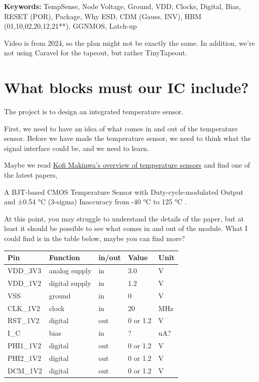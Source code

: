 \textbf{Keywords:} TempSense, Node Voltage, Ground, VDD, Clocks,
Digital, Bias, RESET (POR), Package, Why ESD, CDM (Gauss, INV), HBM
(01,10,02,20,12,21**), GGNMOS, Latch-up

Video is from 2024, so the plan might not be exactly the same. In
addition, we're not using Caravel for the tapeout, but rather
TinyTapeout.

\section{What blocks must our IC
include?}\label{what-blocks-must-our-ic-include}

The project is to design an integrated temperature sensor.

First, we need to have an idea of what comes in and out of the
temperature sensor. Before we have made the temperature sensor, we need
to think what the signal interface could be, and we need to learn.

Maybe we read
\href{http://ei.ewi.tudelft.nl/docs/TSensor_survey.xls}{Kofi Makinwa's
overview of temperature sensors} and find one of the latest papers,

A BJT-based CMOS Temperature Sensor with Duty-cycle-modulated Output and
±0.54 °C (3-sigma) Inaccuracy from -40 °C to 125 °C
.

At this point, you may struggle to understand the details of the paper,
but at least it should be possible to see what comes in and out of the
module. What I could find is in the table below, maybe you can find
more?

\begin{longtable}[]{@{}lllll@{}}
\toprule\noalign{}
Pin & Function & in/out & Value & Unit \\
\midrule\noalign{}
\endhead
\bottomrule\noalign{}
\endlastfoot
VDD\_3V3 & analog supply & in & 3.0 & V \\
VDD\_1V2 & digital supply & in & 1.2 & V \\
VSS & ground & in & 0 & V \\
CLK\_1V2 & clock & in & 20 & MHz \\
RST\_1V2 & digital & out & 0 or 1.2 & V \\
I\_C & bias & in & ? & uA? \\
PHI1\_1V2 & digital & out & 0 or 1.2 & V \\
PHI2\_1V2 & digital & out & 0 or 1.2 & V \\
DCM\_1V2 & digital & out & 0 or 1.2 & V \\
\end{longtable}

